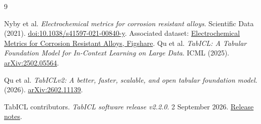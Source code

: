 \documentclass{article}
\begin{document}
\begin{thebibliography}{9}
\raggedright
{}
Nyby et al.
\textit{Electrochemical metrics for corrosion resistant alloys}.
Scientific Data (2021).
\href{https://doi.org/10.1038/s41597-021-00840-y}{doi:10.1038/s41597-021-00840-y}.
Associated dataset:
\href{https://figshare.com/articles/dataset/Electrochemical_Metrics_for_Corrosion_Resistant_Alloys/13038257}{Electrochemical Metrics for Corrosion Resistant Alloys, Figshare}.
Qu et al.
\textit{TabICL: A Tabular Foundation Model for In-Context Learning on Large Data}.
ICML (2025).
\href{https://arxiv.org/abs/2502.05564}{arXiv:2502.05564}.

Qu et al.
\textit{TabICLv2: A better, faster, scalable, and open tabular foundation model}.
(2026).
\href{https://arxiv.org/abs/2602.11139}{arXiv:2602.11139}.

TabICL contributors.
\textit{TabICL software release v2.2.0}.
2 September 2026.
\href{https://github.com/soda-inria/tabicl/releases/tag/v2.2.0}{Release notes}.
\end{thebibliography}
\end{document}
